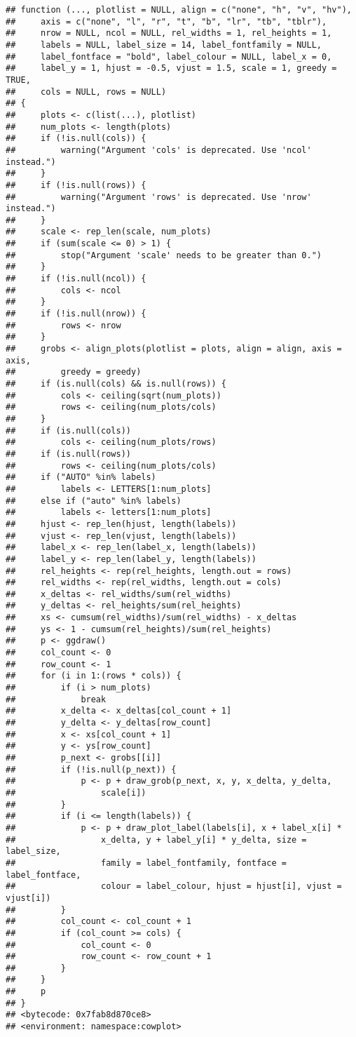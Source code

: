 \documentclass[]{article}
\begin{document}
\begin{verbatim}
## function (..., plotlist = NULL, align = c("none", "h", "v", "hv"), 
##     axis = c("none", "l", "r", "t", "b", "lr", "tb", "tblr"), 
##     nrow = NULL, ncol = NULL, rel_widths = 1, rel_heights = 1, 
##     labels = NULL, label_size = 14, label_fontfamily = NULL, 
##     label_fontface = "bold", label_colour = NULL, label_x = 0, 
##     label_y = 1, hjust = -0.5, vjust = 1.5, scale = 1, greedy = TRUE, 
##     cols = NULL, rows = NULL) 
## {
##     plots <- c(list(...), plotlist)
##     num_plots <- length(plots)
##     if (!is.null(cols)) {
##         warning("Argument 'cols' is deprecated. Use 'ncol' instead.")
##     }
##     if (!is.null(rows)) {
##         warning("Argument 'rows' is deprecated. Use 'nrow' instead.")
##     }
##     scale <- rep_len(scale, num_plots)
##     if (sum(scale <= 0) > 1) {
##         stop("Argument 'scale' needs to be greater than 0.")
##     }
##     if (!is.null(ncol)) {
##         cols <- ncol
##     }
##     if (!is.null(nrow)) {
##         rows <- nrow
##     }
##     grobs <- align_plots(plotlist = plots, align = align, axis = axis, 
##         greedy = greedy)
##     if (is.null(cols) && is.null(rows)) {
##         cols <- ceiling(sqrt(num_plots))
##         rows <- ceiling(num_plots/cols)
##     }
##     if (is.null(cols)) 
##         cols <- ceiling(num_plots/rows)
##     if (is.null(rows)) 
##         rows <- ceiling(num_plots/cols)
##     if ("AUTO" %in% labels) 
##         labels <- LETTERS[1:num_plots]
##     else if ("auto" %in% labels) 
##         labels <- letters[1:num_plots]
##     hjust <- rep_len(hjust, length(labels))
##     vjust <- rep_len(vjust, length(labels))
##     label_x <- rep_len(label_x, length(labels))
##     label_y <- rep_len(label_y, length(labels))
##     rel_heights <- rep(rel_heights, length.out = rows)
##     rel_widths <- rep(rel_widths, length.out = cols)
##     x_deltas <- rel_widths/sum(rel_widths)
##     y_deltas <- rel_heights/sum(rel_heights)
##     xs <- cumsum(rel_widths)/sum(rel_widths) - x_deltas
##     ys <- 1 - cumsum(rel_heights)/sum(rel_heights)
##     p <- ggdraw()
##     col_count <- 0
##     row_count <- 1
##     for (i in 1:(rows * cols)) {
##         if (i > num_plots) 
##             break
##         x_delta <- x_deltas[col_count + 1]
##         y_delta <- y_deltas[row_count]
##         x <- xs[col_count + 1]
##         y <- ys[row_count]
##         p_next <- grobs[[i]]
##         if (!is.null(p_next)) {
##             p <- p + draw_grob(p_next, x, y, x_delta, y_delta, 
##                 scale[i])
##         }
##         if (i <= length(labels)) {
##             p <- p + draw_plot_label(labels[i], x + label_x[i] * 
##                 x_delta, y + label_y[i] * y_delta, size = label_size, 
##                 family = label_fontfamily, fontface = label_fontface, 
##                 colour = label_colour, hjust = hjust[i], vjust = vjust[i])
##         }
##         col_count <- col_count + 1
##         if (col_count >= cols) {
##             col_count <- 0
##             row_count <- row_count + 1
##         }
##     }
##     p
## }
## <bytecode: 0x7fab8d870ce8>
## <environment: namespace:cowplot>
\end{verbatim}
\end{document}
